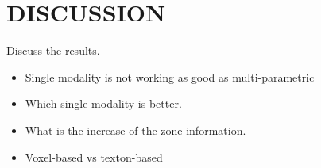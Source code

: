 \section{DISCUSSION}\label{sec:discussion}

Discuss the results.
\begin{itemize}
\item Single modality is not working as good as multi-parametric
\item Which single modality is better.
\item What is the increase of the zone information.
\item Voxel-based vs texton-based
\end{itemize}

